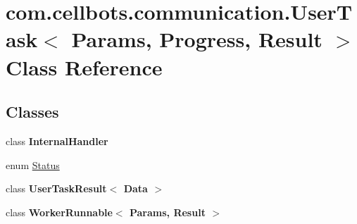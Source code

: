 \hypertarget{classcom_1_1cellbots_1_1communication_1_1_user_task_3_01_params_00_01_progress_00_01_result_01_4}{\section{com.\-cellbots.\-communication.\-User\-Task$<$ Params, Progress, Result $>$ Class Reference}
\label{classcom_1_1cellbots_1_1communication_1_1_user_task_3_01_params_00_01_progress_00_01_result_01_4}
}
\subsection*{Classes}
\begin{DoxyCompactItemize}
\item 
class {\bfseries Internal\-Handler}
\item 
enum \hyperlink{enumcom_1_1cellbots_1_1communication_1_1_user_task_3_01_params_00_01_progress_00_01_result_01_4_1_1_status}{Status}
\item 
class {\bfseries User\-Task\-Result$<$ Data $>$}
\item 
class {\bfseries Worker\-Runnable$<$ Params, Result $>$}
\end{DoxyCompactItemize}
